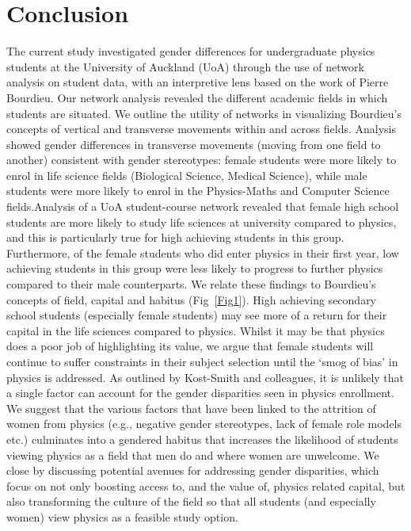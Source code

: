 \section*{Conclusion}
The current study investigated gender differences for undergraduate physics students at the University of Auckland (UoA) through the use of network analysis on student data, with an interpretive lens based on the work of Pierre Bourdieu. Our network analysis revealed the different academic fields in which students are situated. We outline the utility of networks in visualizing Bourdieu's concepts of vertical and transverse movements within and across fields. Analysis showed gender differences in transverse movements (moving from one field to another) consistent with gender stereotypes: female students were more likely to enrol in life science fields (Biological Science, Medical Science), while male students were more likely to enrol in the Physics-Maths and Computer Science fields.Analysis of a UoA student-course network revealed that female high school students are more likely to study life sciences at university compared to physics, and this is particularly true for high achieving students in this group. Furthermore, of the female students who did enter physics in their first year, low achieving students in this group were less likely to progress to further physics compared to their male counterparts. We relate these findings to Bourdieu's concepts of field, capital and habitus (Fig~\ref{Fig1}). High achieving secondary school students (especially female students) may see more of a return for their capital in the life sciences compared to physics. Whilst it may be that physics does a poor job of highlighting its value, we argue that female students will continue to suffer constraints in their subject selection until the `smog of bias'\cite{Kost_Smith_2010} in physics is addressed. As outlined by Kost-Smith and colleagues\cite{Kost_Smith_2010}, it is unlikely that a single factor can account for the gender disparities seen in physics enrollment. We suggest that the various factors that have been linked to the attrition of women from physics (e.g., negative gender stereotypes, lack of female role models etc.) culminates into a gendered habitus that increases the likelihood of students viewing physics as a field that men do and where women are unwelcome. We close by discussing potential avenues for addressing gender disparities, which focus on not only boosting access to, and the value of, physics related capital, but also transforming the culture of the field so that all students (and especially women) view physics as a feasible study option.


